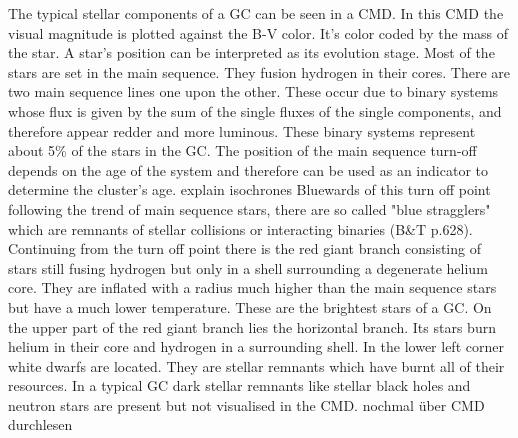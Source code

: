 \par The typical stellar components of a \ac{GC} can be seen in a \ac{CMD}. In this \ac{CMD} the visual magnitude is plotted against the B-V color. It's color coded by the mass of the star. A star's position can be interpreted as its evolution stage. Most of the stars are set in the main sequence. They fusion hydrogen in their cores. There are two main sequence lines one upon the other. These occur due to binary systems whose flux is given by the sum of the single fluxes of the single components, and therefore appear redder and more luminous. These binary systems represent about 5\% of the stars in the \ac{GC}. The position of the main sequence turn-off depends on the age of the system and therefore can be used as an indicator to determine the cluster's age. \color{red} explain isochrones \color{black} Bluewards of this turn off point following the trend of main sequence stars, there are so called "blue stragglers" which are remnants of stellar collisions or interacting binaries (B\&T p.628). Continuing from the turn off point there is the red giant branch consisting of stars still fusing hydrogen but only in a shell surrounding a degenerate helium core. They are inflated with a radius much higher than the main sequence stars but have a much lower temperature. These are the brightest stars of a \ac{GC}. On the upper part of the red giant branch lies the horizontal branch. Its stars burn helium in their core and hydrogen in a surrounding shell. In the lower left corner white dwarfs are located. They are stellar remnants which have burnt all of their resources. In a typical \ac{GC} dark stellar remnants like stellar black holes and neutron stars are present but not visualised in the \ac{CMD}. \color{red} nochmal über \ac{CMD} durchlesen\color{black} 
